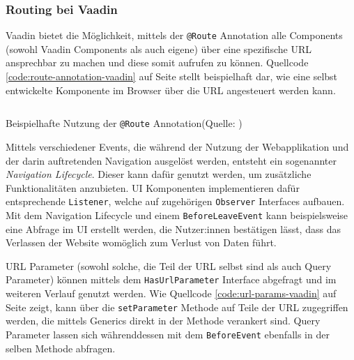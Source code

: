 \documentclass[a4paper,12pt,twoside]{scrreprt}
\begin{document}
\subsubsection{Routing bei Vaadin}
\label{sub-sub-sec:routing-herangehensweise-vaadin}
Vaadin bietet die Möglichkeit, mittels der \texttt{@Route} Annotation alle Components (sowohl Vaadin Components als auch eigene) über eine spezifische URL ansprechbar zu machen und diese somit aufrufen zu können. Quellcode \ref{code:route-annotation-vaadin} auf Seite    \pageref{code:route-annotation-vaadin} stellt beispielhaft dar, wie eine selbst entwickelte Komponente im Browser über die URL  angesteuert werden kann. \parencite[][Framework - Routing and Navigation - Defining Routes with @Route]{vaadin_ltd_documentation_nodate}

\begin{listing}[ht]
    \inputminted[fontsize=\footnotesize,linenos]{java}{code/route_annotation_vaadin.java}
    \caption[Beispielhafte Nutzung der \texttt{@Route} Annotation]{Beispielhafte Nutzung der \texttt{@Route} Annotation\newline(Quelle: \cite[][Framework - Routing and Navigation - Defining Routes with @Route]{vaadin_ltd_documentation_nodate})}
    \label{code:route-annotation-vaadin}
\end{listing}

Mittels verschiedener Events, die während der Nutzung der Webapplikation und der darin auftretenden Navigation ausgelöst werden, entsteht ein sogenannter \textit{Navigation Lifecycle}. Dieser kann dafür genutzt werden, um zusätzliche Funktionalitäten anzubieten. UI Komponenten implementieren dafür entsprechende \texttt{Listener}, welche auf zugehörigen \texttt{Observer} Interfaces aufbauen. Mit dem Navigation Lifecycle und einem \texttt{BeforeLeaveEvent} kann beispielsweise eine Abfrage im \acl{UI} erstellt werden, die Nutzer:innen bestätigen lässt, dass das Verlassen der Website womöglich zum Verlust von Daten führt. \parencite[][Framework - Routing and Navigation - Navigation Lifecycle]{vaadin_ltd_documentation_nodate}

\newpage

URL Parameter (sowohl solche, die Teil der URL selbst sind als auch Query Parameter) können mittels dem \texttt{HasUrlParameter} Interface abgefragt und im weiteren Verlauf genutzt werden. Wie Quellcode \ref{code:url-params-vaadin} auf Seite \pageref{code:url-params-vaadin} zeigt, kann über die \texttt{setParameter} Methode auf Teile der URL zugegriffen werden, die mittels Generics direkt in der Methode verankert sind. Query Parameter lassen sich währenddessen mit dem \texttt{BeforeEvent} ebenfalls in der selben Methode abfragen. \parencite[][Framework - Routing and Navigation - Routing and URL Parameters]{vaadin_ltd_documentation_nodate}
\end{document}
